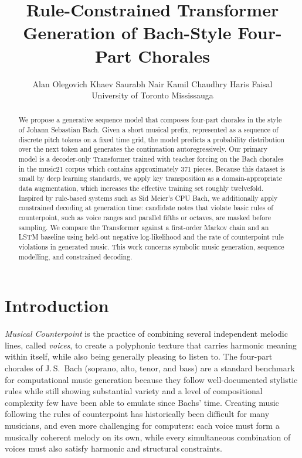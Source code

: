 \documentclass{article}
\title{Rule-Constrained Transformer Generation of Bach-Style Four-Part Chorales}
\author{
  Alan Olegovich Khaev \And
  Saurabh Nair \And
  Kamil Chaudhry \And
  Haris Faisal \\
  University of Toronto Mississauga
}
\begin{document}
\maketitle

\begin{abstract}
We propose a generative sequence model that composes four-part chorales in the style of Johann Sebastian Bach. Given a short musical prefix, represented as a sequence of discrete pitch tokens on a fixed time grid, the model predicts a probability distribution over the next token and generates the continuation autoregressively. Our primary model is a decoder-only Transformer trained with teacher forcing on the Bach chorales in the music21 corpus which contains approximately 371 pieces. Because this dataset is small by deep learning standards, we apply key transposition as a domain-appropriate data augmentation, which increases the effective training set roughly twelvefold. Inspired by rule-based systems such as Sid Meier's CPU Bach, we additionally apply constrained decoding at generation time: candidate notes that violate basic rules of counterpoint, such as voice ranges and parallel fifths or octaves, are masked before sampling. We compare the Transformer against a first-order Markov chain and an LSTM baseline using held-out negative log-likelihood and the rate of counterpoint rule violations in generated music. This work concerns symbolic music generation, sequence modelling, and constrained decoding.
\end{abstract}

\section{Introduction}

\emph{Musical Counterpoint} is the practice of combining several independent melodic lines, called \emph{voices}, to create a polyphonic texture that carries harmonic meaning within itself, while also being generally pleasing to listen to. The four-part chorales of J.\,S.~Bach (soprano, alto, tenor, and bass) are a standard benchmark for computational music generation because they follow well-documented stylistic rules while still showing substantial variety and a level of compositional complexity few have been able to emulate since Bachs' time. Creating music following the rules of counterpoint has historically been difficult for many musicians, and even more challenging for computers: each voice must form a musically coherent melody on its own, while every simultaneous combination of voices must also satisfy harmonic and structural constraints.
\end{document}
